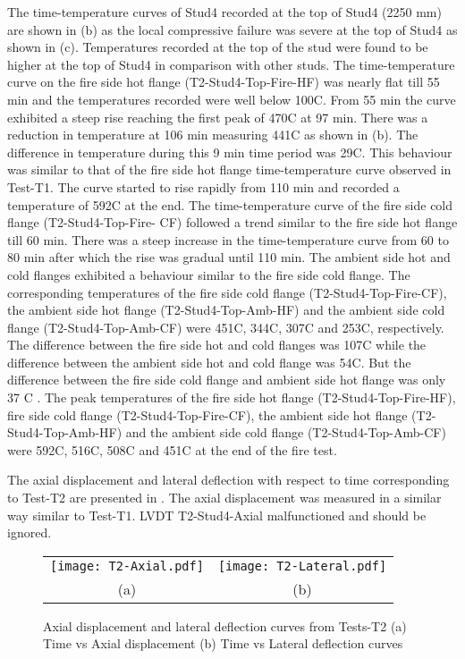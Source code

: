 The time-temperature curves of Stud4 recorded at the top of Stud4 (2250 mm) are shown in  (b) as the local compressive failure was severe at the top of Stud4 as shown in  (c). Temperatures recorded at the top of the stud were found to be higher at the top of Stud4 in comparison with other studs. The time-temperature curve on the fire side hot flange (T2-Stud4-Top-Fire-HF) was nearly flat till 55 min and the temperatures recorded were well below 100\degree C. From 55 min the curve exhibited a steep rise reaching the first peak of 470\degree C at 97 min. There was a reduction in temperature at 106 min measuring 441\degree C as shown in  (b). The difference in temperature during this 9 min time period was 29\degree C. This behaviour was similar to that of the fire side hot flange time-temperature curve observed in Test-T1. The curve started to rise rapidly from 110 min and recorded a temperature of 592\degree C at the end. The time-temperature curve of the fire side cold flange (T2-Stud4-Top-Fire- CF) followed a trend similar to the fire side hot flange till 60 min. There was a steep increase in the time-temperature curve from 60 to 80 min after which the rise was gradual until 110 min. The ambient side hot and cold flanges exhibited a behaviour similar to the fire side cold flange. The corresponding temperatures of the fire side cold flange (T2-Stud4-Top-Fire-CF), the ambient side hot flange (T2-Stud4-Top-Amb-HF) and the ambient side cold flange (T2-Stud4-Top-Amb-CF) were 451\degree C, 344\degree C, 307\degree C and 253\degree C, respectively. The difference between the fire side hot and cold flanges was 107\degree C while the difference between the ambient side hot and cold flange was 54\degree C. But the difference between the fire side cold flange and ambient side hot flange was only 37 \degree C . The peak temperatures of the fire side hot flange (T2-Stud4-Top-Fire-HF), fire side cold flange (T2-Stud4-Top-Fire-CF), the ambient side hot flange (T2-Stud4-Top-Amb-HF) and the ambient side cold flange (T2-Stud4-Top-Amb-CF) were 592\degree C, 516\degree C, 508\degree C and 451\degree C at the end of the fire test.

The axial displacement and lateral deflection with respect to time corresponding to Test-T2 are presented in . The axial displacement was measured in a similar way similar to Test-T1. LVDT T2-Stud4-Axial malfunctioned and should be ignored.
	\begin{figure}[!htbp]
	\centering
		\begin{tabular}{cc}
			\texttt{[image: T2-Axial.pdf]} & \texttt{[image: T2-Lateral.pdf]} \\
			(a) & (b) \\
		\end{tabular} 
		\caption{Axial displacement and lateral deflection curves from Tests-T2 (a) Time vs Axial displacement (b) Time vs Lateral deflection curves}
		\label{fig:T2-Axial-Lateral}
\end{figure}

